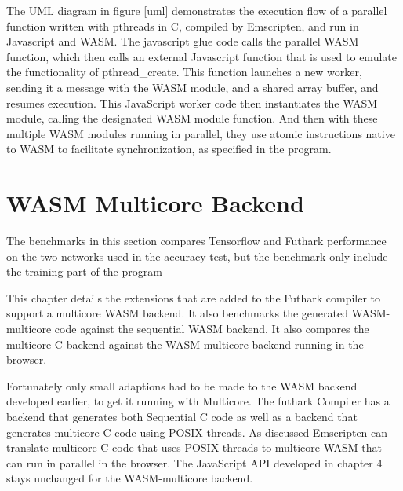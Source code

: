 \documentclass[11pt]{book}
\begin{document}

The UML diagram in figure \ref{uml} demonstrates the execution flow of a parallel function written with pthreads in C, compiled by Emscripten, and run in Javascript and WASM. The javascript glue code calls the parallel WASM function, which then calls an external Javascript function that is used to emulate the functionality of pthread\_create. This function launches a new worker, sending it a message with the WASM module, and a shared array buffer, and resumes execution. This JavaScript worker code then  instantiates the WASM module, calling the designated WASM module function. And then with these multiple WASM modules running in parallel, they use atomic instructions native to WASM to facilitate synchronization, as specified in the program.




\newpage

\chapter{WASM Multicore Backend}
The benchmarks in this section compares Tensorflow and Futhark performance on the
two networks used in the accuracy test, but the benchmark only include the training part of the program

This chapter details the extensions that are added to the Futhark compiler to support a multicore WASM backend. It also benchmarks the generated WASM-multicore code against the sequential WASM backend. It also compares the multicore C backend against the WASM-multicore backend running in the browser.

Fortunately only small adaptions had to be made to the WASM backend developed earlier, to get it running with Multicore. The futhark Compiler has a backend that generates both Sequential C code as well as a backend that generates multicore C code using POSIX threads. As discussed Emscripten can translate multicore C code that uses POSIX threads to multicore WASM that can run in parallel in the browser. The JavaScript API developed in chapter 4 stays unchanged for the WASM-multicore backend. 
\end{document}
